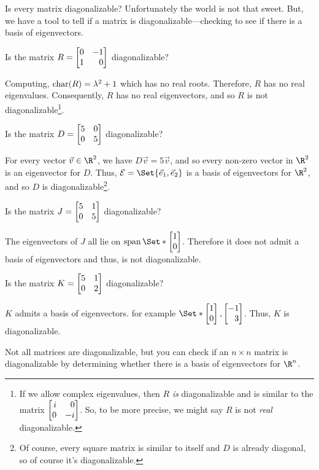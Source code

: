 Is every matrix diagonalizable? Unfortunately the world is not that sweet. But, we have a tool to tell if a matrix is
diagonalizable---checking to see if there is a basis of eigenvectors.

\begin{example}
	Is the matrix $R=\mat{0&-1\\1&0}$ diagonalizable?

	Computing, $\operatorname{char}(R)=\lambda^2+1$ which has no real roots. Therefore,
	$R$ has no real eigenvalues. Consequently, $R$ has no real eigenvectors,
	and so $R$ is not diagonalizable\footnote{ If we allow complex eigenvalues, then $R$ \emph{is}
	diagonalizable and is similar to the matrix $\mat{i&0\\0&-i}$. So, to be more precise, we
	might say $R$ is not \emph{real} diagonalizable.}.
\end{example}

\begin{example}
	Is the matrix $D=\mat{5&0\\0&5}$ diagonalizable?

	For every vector $\vec v\in \R^2$, we have $D\vec v=5\vec v$, and so every
	non-zero vector in $\R^2$ is an eigenvector for $D$. Thus, $\mathcal E=\Set{\xhat, \yhat}$
	is a basis of eigenvectors for $\R^2$, and so $D$ is diagonalizable\footnote{ Of course, every
	square matrix is similar to itself and $D$ is already diagonal, so of course it's diagonalizable.}.
\end{example}

\begin{example}
	Is the matrix $J=\mat{5&1\\0&5}$ diagonalizable?

	The eigenvectors of $J$ all lie on $\Span\Set*{\mat{1\\0}}$. Therefore it does not admit a basis of
	eigenvectors and thus, is not diagonalizable.
\end{example}

\begin{example}
	Is the matrix $K=\mat{5&1\\0&2}$ diagonalizable?
	
	$K$ admits a basis of eigenvectors. for example $\Set*{\mat{1\\0},\mat{-1\\3}}$. Thus, $K$ is
	diagonalizable.
\end{example}

\begin{emphbox}[Takeaway]
	Not all matrices are diagonalizable, but you can check if an $n\times n$
	matrix is diagonalizable by determining whether there is a basis of eigenvectors for $\R^n$.
\end{emphbox}

